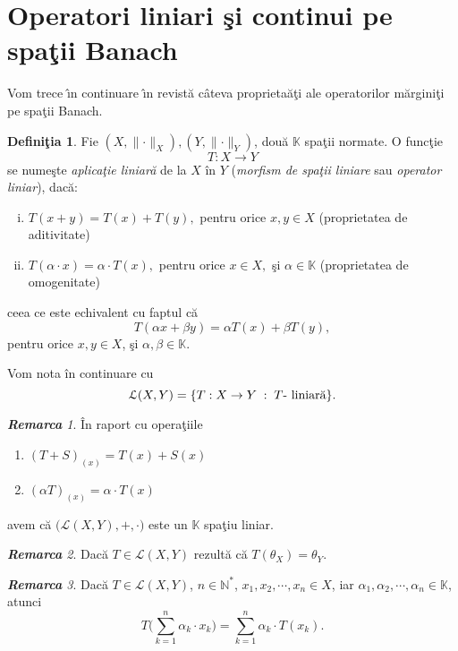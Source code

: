 \documentclass[ a4paper, 12pt]{report}
\theoremstyle{definition}
\newtheorem{definition}{\bf Defini\c tia}[section]
\theoremstyle{remark}
\newtheorem{remarc}{\bf Remarca}[section]
\numberwithin{equation}{section}
\begin{document}
\newpage

\section{Operatori liniari \c si continui pe spa\c tii Banach}

Vom trece \^\i n continuare \^\i n revist\u a c\^ ateva proprieta\u a\c ti ale operatorilor m\u argini\c ti pe spa\c tii Banach.


\begin{definition}
Fie $(X,\lVert \cdot \rVert_{X}), (Y,\lVert \cdot \rVert_{Y})$, dou\u a $\mathbb{K}$ spa\c tii normate.
O func\c tie
$$T : X \rightarrow Y$$ se nume\c ste {\it aplica\c tie liniar\u a} de la $X$ \^in $Y$ ({\it morfism de spa\c tii liniare} sau {\it operator liniar}), dac\u a:
\begin{enumerate}[(i)]
\item $T(x+y) = T(x) + T(y),$ pentru orice $x,y \in X$ (proprietatea de aditivitate)
\item $T(\alpha \cdot x) = \alpha \cdot T(x),$ pentru orice $x \in X,$ \c si $\alpha \in \mathbb{K}$ (proprietatea de omogenitate)
\end{enumerate}
ceea ce este echivalent cu faptul c\u a $$T(\alpha x + \beta y) = \alpha T(x) + \beta T(y),$$ pentru orice $x,y \in X$, \c si $\alpha, \beta \in \mathbb{K}.$
\end{definition}

Vom nota \^in continuare cu
$$\mathcal{L}(X,Y) = \{ T: X \rightarrow Y\; : \; T \hbox{- liniar\u a} \}.$$

\begin{remarc}
\^In raport cu opera\c tiile
\begin{enumerate}
\item $(T+S)_{(x)} = T(x) + S(x)$
\item $(\alpha T)_{(x)} = \alpha \cdot T(x)$
\end{enumerate}
avem c\u a $\Big( \mathcal{L}(X,Y), + , \cdot\Big)$ este un $\mathbb{K}$ spa\c tiu liniar.
\end{remarc}

\begin{remarc}
Dac\u a $T \in \mathcal{L}(X,Y)$ rezult\u a c\u a $T(\theta_{X}) = \theta_{Y}$.
\end{remarc}

\begin{remarc}
Dac\u a $T \in \mathcal{L}(X,Y)$,  $n \in \mathbb{N}^{\ast}$, $x_1,x_2,\cdots,x_n \in X$, iar $\alpha_1,\alpha_2, \cdots, \alpha_n \in \mathbb{K}$, atunci
$$T\Big( \sum\limits_{k=1}^{n} \alpha_k \cdot x_k \Big) = \sum\limits_{k=1}^{n} \alpha_k \cdot T(x_k).$$
\end{remarc}
\end{document}
